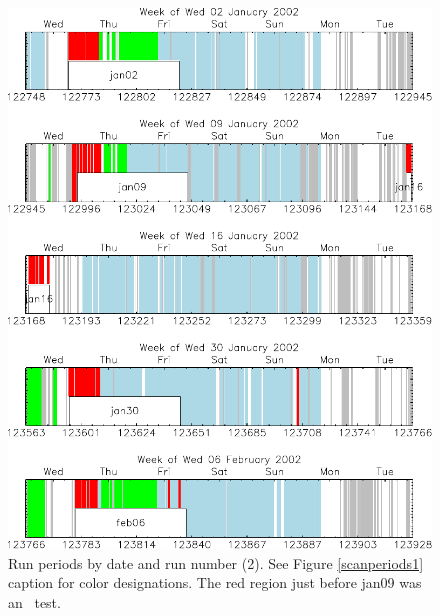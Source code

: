 \documentclass[aps,prd,preprint,superscriptaddress,tightenlines,nofootinbib,floatfix]{revtex4}
\begin{document}
\begin{figure}[p]
  \includegraphics[width=0.95\linewidth]{scan_periods2}
  \caption{\label{scanperiods2} Run periods by date and run number
  (2).  See Figure \ref{scanperiods1} caption for color
  designations.  The red region just before jan09 was an \uone\ test.}
\end{figure}
\end{document}
